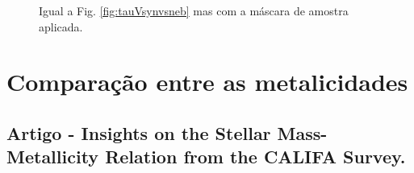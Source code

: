 \begin{figure}
	\centering
	\caption[Comparação entre os coeficientes de extinção (com máscara).]
	{Igual a Fig. \ref{fig:tauVsynvsneb} mas com a máscara de amostra aplicada.} 
	\label{fig:tauVsynvsnebMask}
\end{figure}


\section{Comparação entre as metalicidades}
\label{sec:synvsneb:Z}

\subsection{Artigo - Insights on the Stellar Mass-Metallicity Relation from the CALIFA Survey.}

